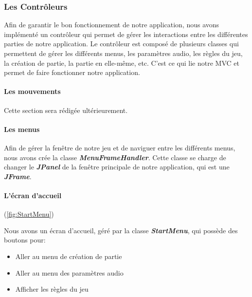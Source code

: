 \subsubsection{Les Contrôleurs}
\label{subsubsec:controleur}

Afin de garantir le bon fonctionnement de notre application, nous avons implémenté un contrôleur qui permet de gérer les interactions entre les différentes parties de notre application. Le contrôleur est composé de plusieurs classes qui permettent de gérer les différents menus, les paramètres audio, les règles du jeu, la création de partie, la partie en elle-même, etc. C'est ce qui lie notre MVC et permet de faire fonctionner notre application.

\paragraph{Les mouvements}

Cette section sera rédigée ultérieurement.

\paragraph{Les menus}

Afin de gérer la fenêtre de notre jeu et de naviguer entre les différents menus, nous avons crée la classe \textbf{\textit{MenuFrameHandler}}. Cette classe se charge de changer le \textbf{\textit{JPanel}} de la fenêtre principale de notre application, qui est une \textbf{\textit{JFrame}}.

\paragraph{L'écran d'accueil} (\ref{fig:StartMenu})

Nous avons un écran d'accueil, géré par la classe \textbf{\textit{StartMenu}}, qui possède des boutons pour:

\begin{itemize}
    \item Aller au menu de création de partie
    \item Aller au menu des paramètres audio
    \item Afficher les règles du jeu
\end{itemize}


